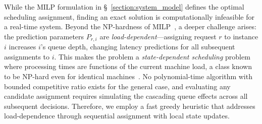 \documentclass[letterpaper, anonymous, twocolumn, 10pt]{article}
\begin{document}
While the MILP formulation in \S~\ref{section:system_model} defines the optimal scheduling assignment, finding an exact solution is computationally infeasible for a real-time system.
Beyond the NP-hardness of MILP~\cite{nair2021solvingmixedintegerprograms}, a deeper challenge arises: the prediction parameters $P_{r,i}$ are \emph{load-dependent}---assigning request $r$ to instance $i$ increases $i$'s queue depth, changing latency predictions for all subsequent assignments to $i$.
This makes the problem a \emph{state-dependent scheduling} problem where processing times are functions of the current machine load, a class known to be NP-hard even for identical machines~\cite{job_shop_np_hard}.
No polynomial-time algorithm with bounded competitive ratio exists for the general case, and evaluating any candidate assignment requires simulating the cascading queue effects across all subsequent decisions.
Therefore, we employ a fast greedy heuristic that addresses load-dependence through sequential assignment with local state updates.
\end{document}

